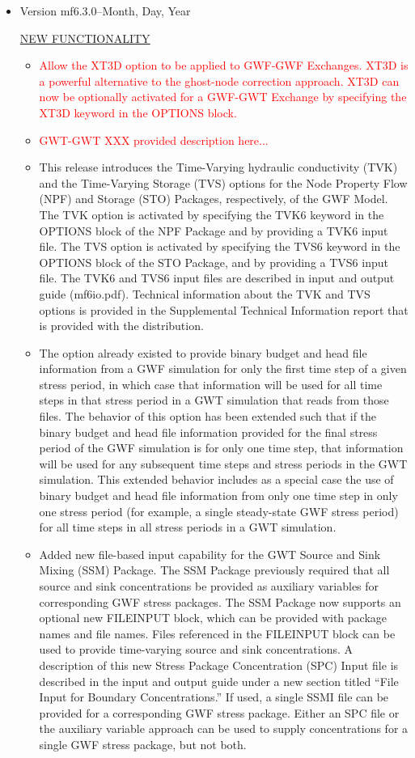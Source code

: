 \documentclass[11pt,twoside,twocolumn]{usgsreport}
\begin{document}
\begin{itemize}
	\item Version mf6.3.0--Month, Day, Year
	
	\underline{NEW FUNCTIONALITY}
	\begin{itemize}
	        \item \textcolor{red}{Allow the XT3D option to be applied to GWF-GWF Exchanges.  XT3D is a powerful alternative to the ghost-node correction approach.  XT3D can now be optionally activated for a GWF-GWT Exchange by specifying the XT3D keyword in the OPTIONS block.}
	        \item \textcolor{red}{GWT-GWT XXX provided description here...}
	        \item This release introduces the Time-Varying hydraulic conductivity (TVK) and the Time-Varying Storage (TVS) options for the Node Property Flow (NPF) and Storage (STO) Packages, respectively, of the GWF Model.  The TVK option is activated by specifying the TVK6 keyword in the OPTIONS block of the NPF Package and by providing a TVK6 input file.  The TVS option is activated by specifying the TVS6 keyword in the OPTIONS block of the STO Package, and by providing a TVS6 input file.  The TVK6 and TVS6 input files are described in input and output guide (mf6io.pdf).  Technical information about the TVK and TVS options is provided in the Supplemental Technical Information report that is provided with the distribution.
	        \item The option already existed to provide binary budget and head file information from a GWF simulation for only the first time step of a given stress period, in which case that information will be used for all time steps in that stress period in a GWT simulation that reads from those files. The behavior of this option has been extended such that if the binary budget and head file information provided for the final stress period of the GWF simulation is for only one time step, that information will be used for any subsequent time steps and stress periods in the GWT simulation. This extended behavior includes as a special case the use of binary budget and head file information from only one time step in only one stress period (for example, a single steady-state GWF stress period) for all time steps in all stress periods in a GWT simulation.
	        \item Added new file-based input capability for the GWT Source and Sink Mixing (SSM) Package.  The SSM Package previously required that all source and sink concentrations be provided as auxiliary variables for corresponding GWF stress packages.  The SSM Package now supports an optional new FILEINPUT block, which can be provided with package names and file names.  Files referenced in the FILEINPUT block can be used to provide time-varying source and sink concentrations.  A description of this new Stress Package Concentration (SPC) Input file is described in the input and output guide under a new section titled ``File Input for Boundary Concentrations.''  If used, a single SSMI file can be provided for a corresponding GWF stress package.  Either an SPC file or the auxiliary variable approach can be used to supply concentrations for a single GWF stress package, but not both.

\end{itemize}
\end{itemize}
\end{document}
